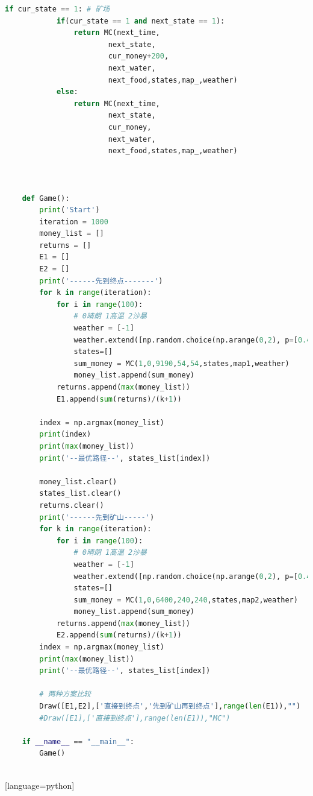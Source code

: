 \documentclass[withoutpreface,bwprint]{cumcmthesis} %
\begin{document}
\begin{appendices}
\begin{lstlisting}[language=python]
        if cur_state == 1: # 矿场
            if(cur_state == 1 and next_state == 1):
                return MC(next_time, 
                        next_state, 
                        cur_money+200, 
                        next_water, 
                        next_food,states,map_,weather)
            else:
                return MC(next_time, 
                        next_state, 
                        cur_money, 
                        next_water, 
                        next_food,states,map_,weather)
               
    
    
    def Game():
        print('Start')
        iteration = 1000
        money_list = []
        returns = []
        E1 = []
        E2 = []
        print('------先到终点-------')
        for k in range(iteration):
            for i in range(100):
                # 0晴朗 1高温 2沙暴
                weather = [-1]
                weather.extend([np.random.choice(np.arange(0,2), p=[0.4,0.6]) for _ in range(10)] )
                states=[]
                sum_money = MC(1,0,9190,54,54,states,map1,weather)
                money_list.append(sum_money)
            returns.append(max(money_list))
            E1.append(sum(returns)/(k+1))
    
        index = np.argmax(money_list)
        print(index)
        print(max(money_list))
        print('--最优路径--', states_list[index])
    
        money_list.clear()
        states_list.clear()
        returns.clear()
        print('------先到矿山-----')
        for k in range(iteration):
            for i in range(100):
                # 0晴朗 1高温 2沙暴
                weather = [-1]
                weather.extend([np.random.choice(np.arange(0,2), p=[0.4,0.6]) for _ in range(10)] )
                states=[]
                sum_money = MC(1,0,6400,240,240,states,map2,weather)
                money_list.append(sum_money)
            returns.append(max(money_list))
            E2.append(sum(returns)/(k+1))
        index = np.argmax(money_list)
        print(max(money_list))
        print('--最优路径--', states_list[index])
        
        # 两种方案比较
        Draw([E1,E2],['直接到终点','先到矿山再到终点'],range(len(E1)),"")
        #Draw([E1],['直接到终点'],range(len(E1)),"MC")
    
    if __name__ == "__main__":
        Game()
    
\end{lstlisting}[language=python]


\end{appendices}
\end{document}
